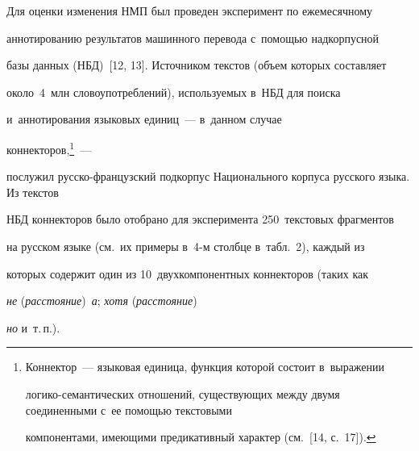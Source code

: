 Для оценки изменения НМП был проведен эксперимент по ежемесячному 


аннотированию результатов машинного перевода с~помощью надкорпусной 


базы данных (НБД)~[12, 13]. Источником текстов (объем которых составляет 


около~4~млн словоупотреблений), используемых в~НБД для поиска 


и~аннотирования языковых единиц~--- в~данном случае 


коннекторов,\footnote{Коннектор~--- языковая единица, функция которой состоит в~выражении 


логико-семантических отношений, существующих между двумя соединенными с~ее помощью текстовыми 


компонентами, имеющими предикативный характер (см.~[14, с.~17]).}~--- 


послужил рус\-ско-французский подкорпус Национального корпуса русского языка. Из текстов 


НБД коннекторов было отобрано для эксперимента 250~текстовых фрагментов 


на русском языке (см.\ их примеры в~4-м столбце в~табл.~2), каждый из 


которых содержит один из 10~двухкомпонентных коннекторов (таких как 


\textit{не} (\textit{расстояние})~\textit{а}; \textit{хотя} (\textit{расстояние}) 


\textit{но} и~т.\,п.). 


